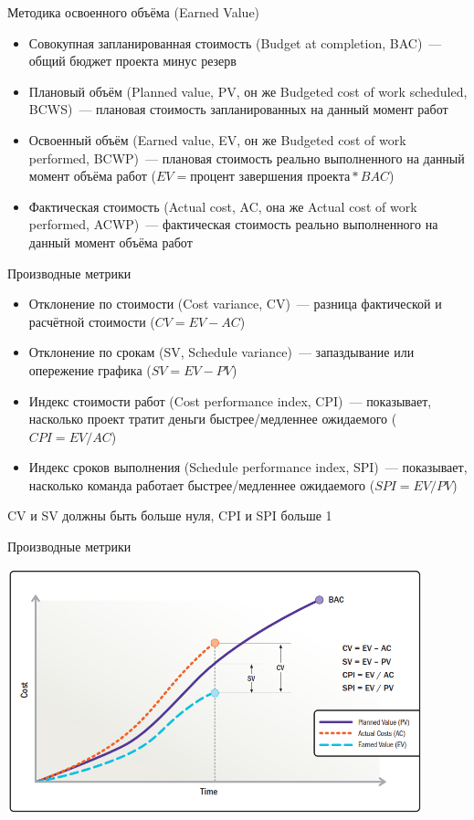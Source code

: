 \documentclass{../../slides-style}
\begin{document}
    \begin{frame}{Методика освоенного объёма (Earned Value)}
        \begin{itemize}
            \item Совокупная запланированная стоимость (Budget at completion, BAC)~--- общий бюджет проекта минус резерв
            \item Плановый объём (Planned value, PV, он же Budgeted cost of work scheduled, BCWS)~--- плановая стоимость запланированных на данный момент работ
            \item Освоенный объём (Earned value, EV, он же Budgeted cost of work performed, BCWP)~--- плановая стоимость реально выполненного на данный момент объёма работ ($EV = \text{процент завершения проекта} * BAC$)
            \item Фактическая стоимость (Actual cost, AC, она же Actual cost of work performed, ACWP)~--- фактическая стоимость реально выполненного на данный момент объёма работ
        \end{itemize}
    \end{frame}

    \begin{frame}{Производные метрики}
        \begin{itemize}
            \item Отклонение по стоимости (Cost variance, CV)~--- разница фактической и расчётной стоимости ($CV = EV - AC$)
            \item Отклонение по срокам (SV, Schedule variance)~--- запаздывание или опережение графика ($SV = EV - PV$)
            \item Индекс стоимости работ (Cost performance index, CPI)~--- показывает, насколько проект тратит деньги быстрее/медленнее ожидаемого ($CPI = EV / AC$)
            \item Индекс сроков выполнения (Schedule performance index, SPI)~--- показывает, насколько команда работает быстрее/медленнее ожидаемого ($SPI = EV / PV$)
        \end{itemize}
        CV и SV должны быть больше нуля, CPI и SPI больше 1
    \end{frame}

    \begin{frame}{Производные метрики}
        \begin{center}
            \includegraphics[width=0.9\textwidth]{svCvMetricsGraph.png}
        \end{center}
    \end{frame}
\end{document}
